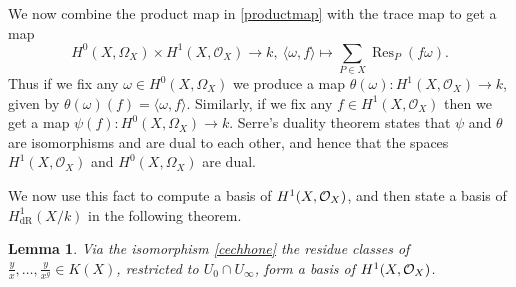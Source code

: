 \documentclass[draft, 11pt]{article} %
\theoremstyle{plain}
\newtheorem{lem}[defn]{Lemma}
\theoremstyle{remark}
\newcommand{\cO}{{\cal O}}
\newcommand{\ra}{\rightarrow}
\newcommand{\hzero}{{H^0(X,\Omega_X)}}
\newcommand{\hone}{H^1(X,\mathcal{O}_X)}
\newcommand{\derhamhone}{H_{\text {dR}}^1(X/k)}
\DeclareMathOperator{\res}{Res}
\begin{document}
We now combine the product map in \eqref{productmap} with the trace map to get a map 
\[
\hzero \times \hone \ra k, \ \langle \omega, f\rangle \mapsto  \sum_{P \in X} \res_P (f\omega).
\]
Thus if we fix any $\omega \in \hzero$ we produce a map $\theta(\omega)\colon \hone \ra k$, given by $\theta(\omega)(f) = \langle \omega , f\rangle$.
Similarly, if we fix any $f \in \hone$ then we get a map $\psi(f) \colon \hzero \ra k$.
Serre's duality theorem \cite[Thm. 2, Chap. II]{algebraicgroupsandclassfields} states that $\psi$ and $\theta$ are isomorphisms and are dual to each other, and hence that the spaces $\hone$ and $\hzero$ are dual.


We now use this fact to compute a basis of $H^1(X,\cO_X)$, and then state a basis of $\derhamhone$ in the following theorem.

\begin{lem}\label{basish1}
 Via the isomorphism \eqref{cechhone} the residue classes of $\frac{y}{x}, \ldots , \frac{y}{x^g} \in K(X)$, restricted to $U_0 \cap U_\infty$, form a basis of $H^1(X,\cO_X)$.
\end{lem}
\end{document}
